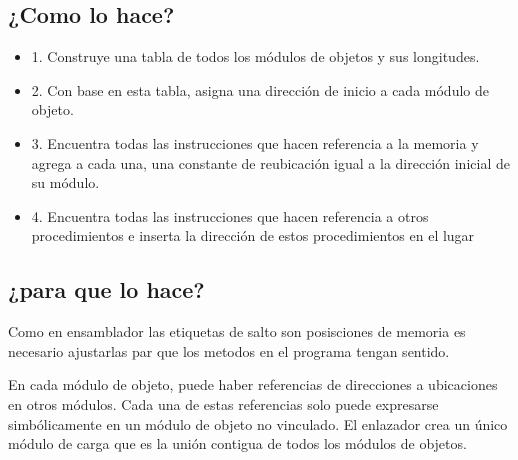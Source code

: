 \documentclass[11pt]{article}
\begin{document}
\subsection{¿Como lo hace?}
\label{sec:orgc938541}
\begin{itemize}
\item 1. Construye una tabla de todos los módulos de objetos y sus longitudes.

\item 2. Con base en esta tabla, asigna una dirección de inicio a cada módulo de objeto.

\item 3. Encuentra todas las instrucciones que hacen referencia a la memoria y agrega a cada una, una constante de reubicación igual a la dirección inicial de su módulo.

\item 4. Encuentra todas las instrucciones que hacen referencia a otros procedimientos e inserta la dirección de estos procedimientos en el lugar
\end{itemize}

\subsection{¿para que lo hace?}
\label{sec:org38d449f}
\begin{mdframed}
Como en ensamblador las etiquetas de salto son posisciones de memoria es necesario ajustarlas par que los metodos en el programa tengan sentido.
\end{mdframed}

En cada módulo de objeto, puede haber referencias de direcciones a ubicaciones en otros módulos. Cada una de estas referencias solo puede expresarse simbólicamente en un módulo de objeto no vinculado. El enlazador crea un único módulo de carga que es la unión contigua de todos los módulos de objetos.
\end{document}
